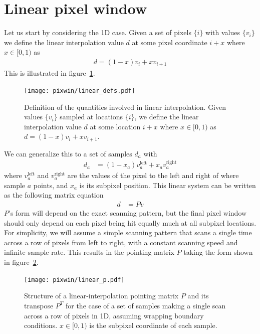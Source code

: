 \documentclass{aa}
\begin{document}



\clearpage

\appendix

\section{Linear pixel window}
\label{sec:linwin}
Let us start by considering the 1D case. Given a set of pixels $\{i\}$ with values $\{v_i\}$
we define the linear interpolation value $d$ at some pixel coordinate $i+x$ where $x\in[0,1)$ as
\begin{align}
	d = (1-x)v_i + x v_{i+1}
\end{align}
This is illustrated in figure~\ref{fig:linear-defs}.
\begin{figure}[h]
	\center
	\texttt{[image: pixwin/linear\_defs.pdf]}
	\caption{Definition of the quantities involved in linear interpolation.
	Given values $\{v_i\}$ sampled at locations $\{i\}$, we define the linear interpolation
	value $d$ at some location $i+x$ where $x\in[0,1)$ as $d = (1-x)v_i + x v_{i+1}$.}
	\label{fig:linear-defs}
\end{figure}

We can generalize this to a set of samples $d_a$ with
\begin{align}
	d_a &= (1-x_a) v_a^\text{left} + x_a v_a^\text{right}
\end{align}
where $v_a^\text{left}$ and $v_a^\text{right}$ are the values of the pixel to the left and right
of where sample $a$ points, and $x_a$ is its subpixel position. This linear system can be written
as the following matrix equation
\begin{align}
	d &= P v
\end{align}
$P$'s form will depend on the exact scanning pattern, but the final pixel window should only depend
on each pixel being hit equally much at all subpixel locations. For simplicity, we will assume a simple
scanning pattern that scans a single time across a row of pixels from left to right, with a constant
scanning speed and infinite sample rate. This results in the pointing matrix $P$ taking the form
shown in figure~\ref{fig:linear-p}.
\begin{figure}[htb]
	\center
	\texttt{[image: pixwin/linear\_p.pdf]}
	\caption{Structure of a linear-interpolation pointing matrix $P$ and its transpose $P^T$
	for the case of a set of samples making a single scan across a row of pixels in 1D, assuming
	wrapping boundary conditions. $x \in [0,1)$ is the subpixel coordinate of each sample.}
	\label{fig:linear-p}
\end{figure}
\end{document}
